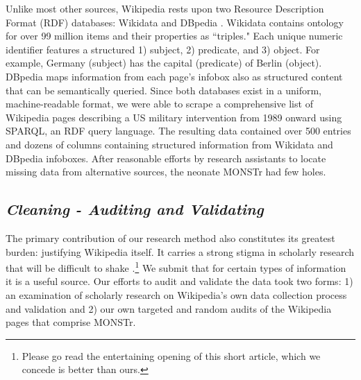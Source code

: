 \documentclass[fleqn,12pt]{article}
\begin{document}
Unlike most other sources, Wikipedia rests upon two Resource Description Format (RDF) databases: Wikidata and DBpedia \citep{malyshev_gettingmostout_2018}. Wikidata contains ontology for over 99 million items and their properties as ``triples." Each unique numeric identifier features a structured 1) subject, 2) predicate, and 3) object. For example, Germany (subject) has the capital (predicate) of Berlin (object). DBpedia maps information from each page's infobox also as structured content that can be semantically queried. Since both databases exist in a uniform, machine-readable format, we were able to scrape a comprehensive list of Wikipedia pages describing a US military intervention from 1989 onward using SPARQL, an RDF query language. The resulting data contained over 500 entries and dozens of columns containing structured information from Wikidata and DBpedia infoboxes. After reasonable efforts by research assistants to locate missing data from alternative sources, the neonate MONSTr had few holes.

\subsection*{\textit{Cleaning - Auditing and Validating}}
The primary contribution of our research method also constitutes its greatest burden: justifying Wikipedia itself. It carries a strong stigma in scholarly research that will be difficult to shake \citep{becker_researchfauxpas_2015}.\footnote{Please go read the entertaining opening of this short article, which we concede is better than ours.} We submit that for certain types of information it is a useful source. Our efforts to audit and validate the data took two forms: 1) an examination of scholarly research on Wikipedia's own data collection process and validation and 2) our own targeted and random audits of the Wikipedia pages that comprise MONSTr.
\end{document}
